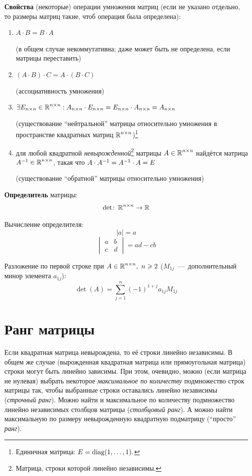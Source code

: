 \documentclass[a4paper,12pt]{article}
\begin{document}
    \textbf{Свойства} (некоторые) операции умножения матриц (если не указано отдельно, то размеры матриц такие, чтоб операция была определена):
    \begin{enumerate}
      \item \sout{$A \cdot B = B \cdot A$}
      
      (в общем случае некоммутативна; даже может быть не определена, если матрицы переставить)
      
      \item $(A \cdot B) \cdot C = A \cdot (B \cdot C)$
      
      (ассоциативность умножения)
      
      \item $\exists E_{n\times n} \in \operatorname{\mathbb R}^{n\times n}: A_{n\times n} \cdot E_{n\times n} = E_{n\times n} \cdot A_{n\times n} = A_{n\times n}$
      
      (существование ``нейтральной'' матрицы относительно умножения в пространстве квадратных матриц $\operatorname{\mathbb R}^{n\times n}$)\footnote{Единичная матрица: $E = \operatorname{diag}(1, \ldots, 1).$}
      
      \item для любой квадратной \emph{невырожденной}\footnote{Матрица, строки которой линейно независимы.} матрицы $A \hm\in \RR^{n\times n}$ найдётся матрица $A^{-1} \hm\in \RR^{n\times n}$, такая что $A \hm\cdot A^{-1} = A^{-1} \hm\cdot A = E$
      
      (существование ``обратной'' матрицы относительно умножения)
    \end{enumerate}
    
    \textbf{Определитель} матрицы:
    \[
      \det\colon \operatorname{\mathbb R}^{n\times n} \to \operatorname{\mathbb R}
    \]
    
    Вычисление определителя:
    \[
      |a| = a
    \]
    \[
      \begin{vmatrix}
        a & b\\
        c & d
      \end{vmatrix} = ad - cb
    \]
    
    Разложение по первой строке при $A \hm\in \RR^{n\times n},\ n \hm\geq 2$ ($M_{1j}$~---~дополнительный минор элемента $a_{1j}$):
    \[
      \det(A) = \sum\limits_{j = 1}^n (-1)^{1 + j} a_{1j} M_{1j}
    \]
    
    
  \section{Ранг матрицы}
    Если квадратная матрица невырождена, то её строки линейно независимы.
    В общем же случае (вырожденная квадратная матрица или прямоугольная матрица) строки могут быть линейно зависимы.
    При этом, очевидно, можно (если матрица не нулевая) выбрать некоторое \emph{максимальное по количеству} подмножество строк матрицы так, чтобы выбранные строки оставались линейно независимы (\emph{строчный ранг}).
    Можно найти и максимальное по количеству подмножество линейно независимых столбцов матрицы (\emph{столбцовый ранг}).
    А можно найти максимальную по размеру невырожденную квадратную подматрицу (``просто'' \emph{ранг}).
    
\end{document}
